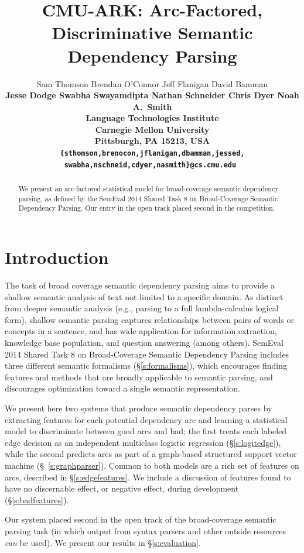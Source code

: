 \documentclass[11pt]{article}
\title{CMU-ARK: Arc-Factored, Discriminative Semantic Dependency Parsing}
\author{
	Sam Thomson \quad
	Brendan O'Connor \quad
	Jeff Flanigan \quad
	David Bamman \quad  \\
	\bf{Jesse Dodge \quad
	Swabha Swayamdipta \quad
	Nathan Schneider \quad
	Chris Dyer \quad
	Noah A.~Smith} \\
  Language Technologies Institute \\
  Carnegie Mellon University \\
  Pittsburgh, PA 15213, USA \\
  {\tt\{sthomson,brenocon,jflanigan,dbamman,jessed,}\\
   \tt{swabha,nschneid,cdyer,nasmith\}@cs.cmu.edu}
}
\date{}
\begin{document}
\maketitle

\begin{abstract}
We present an arc-factored statistical model for broad-coverage
semantic dependency parsing, as defined by the SemEval 2014 Shared
Task 8 on
Broad-Coverage Semantic Dependency Parsing.    Our entry in the open
track placed second in the competition.
\end{abstract}



\section{Introduction}

The task of broad coverage semantic dependency parsing aims to provide a
shallow semantic analysis of text not limited to a specific domain.
As distinct from deeper semantic analysis (e.g., parsing to a full
lambda-calculus logical form), shallow semantic parsing captures relationships
between pairs of words or concepts in a sentence, and has wide application for
information extraction, knowledge base population, and question answering (among others).
SemEval 2014 Shared Task 8 on Broad-Coverage Semantic Dependency
Parsing \cite{oepens_broad_2014} includes three different semantic
formalisms (\S\ref{s:formalisms}), which encourages finding features and methods
that are broadly applicable to semantic parsing, and discourages optimization
toward a single semantic representation.

We present here two systems that produce semantic dependency parses by extracting
features for each potential dependency arc and learning a statistical model to
discriminate between good arcs and bad;
the first treats each labeled edge decision as an independent multiclass
logistic regression (\S\ref{s:logitedge}), while the second predicts arcs
as part of a graph-based structured support vector machine (\S~\ref{s:graphparser}).
Common to both models are a rich set of features on arcs, described in
\S\ref{s:edgefeatures}.  We include a discussion of features found to
have no discernable effect, or negative effect, during development (\S\ref{s:badfeatures}).

Our system placed second in the open track of the broad-coverage semantic
parsing task (in which output from syntax parsers and other outside resources \emph{can} be used).
We present our results in \S\ref{s:evaluation}.
\end{document}
